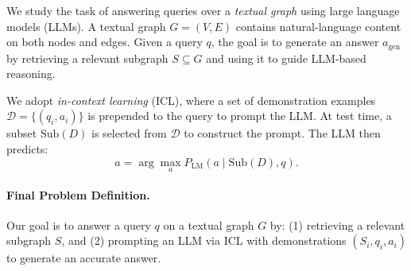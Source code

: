 
We study the task of answering queries over a \emph{textual graph} using large language models (LLMs). A textual graph \( G = (V, E) \) contains natural-language content on both nodes and edges. Given a query \( q \), the goal is to generate an answer \( a_{\mathrm{gen}} \) by retrieving a relevant subgraph \( S \subseteq G \) and using it to guide LLM-based reasoning.

We adopt \emph{in-context learning} (ICL), where a set of demonstration examples \(\mathcal{D} = \{(q_i, a_i)\}\) is prepended to the query to prompt the LLM. At test time, a subset \(\mathrm{Sub}(D)\) is selected from \(\mathcal{D}\) to construct the prompt. The LLM then predicts:
\[
\hat{a} = \arg\max_a P_{\mathrm{LM}}(a \mid \mathrm{Sub}(D), q).
\]

\paragraph{Final Problem Definition.}
Our goal is to answer a query \(q\) on a textual graph \(G\) by: (1) retrieving a relevant subgraph \(S\), and (2) prompting an LLM via ICL with demonstrations \((S_i, q_i, a_i)\) to generate an accurate answer.
